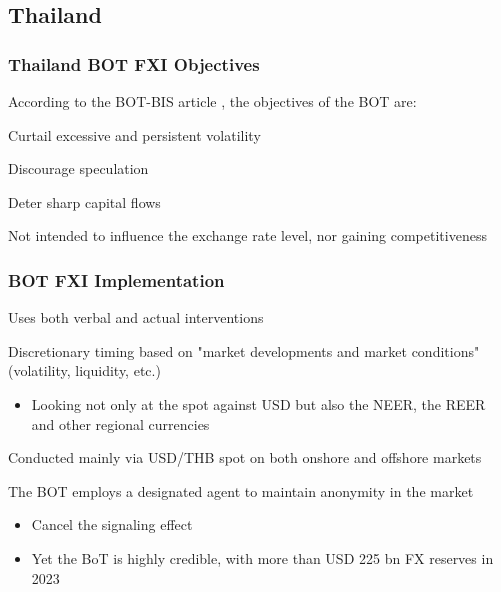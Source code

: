 \documentclass{beamer}
\newenvironment{wideitemize}{\itemize\addtolength{\itemsep}{10pt}}{\enditemize}
\begin{document}
\subsection{Thailand}

\begin{frame}
  \frametitle{Thailand BOT FXI Objectives}
  According to the BOT-BIS article \href{https://www.bis.org/publ/bppdf/bispap104x.pdf}{}, the objectives of the BOT are:
  \begin{wideitemize}
    \item Curtail excessive and persistent volatility
    \item Discourage speculation
    \item Deter sharp capital flows
    \item Not intended to influence the exchange rate level, nor gaining competitiveness
  \end{wideitemize}
\end{frame}


\begin{frame}
  \frametitle{BOT FXI Implementation}

  \begin{wideitemize}
    \item Uses both verbal and actual interventions
    \item Discretionary timing based on "market developments and market conditions" (volatility, liquidity, etc.)
      \begin{itemize}
      \item Looking not only at the spot against USD but also the NEER, the REER and other regional currencies
      \end{itemize}
    \item Conducted mainly via USD/THB spot on both onshore and offshore markets
    \item The BOT employs a designated agent to maintain anonymity in the market
      \begin{itemize}
      \item Cancel the signaling effect 
      \item Yet the BoT is highly credible, with more than USD 225 bn FX reserves in 2023
      \end{itemize}
  \end{wideitemize}  
\end{frame}
\end{document}
